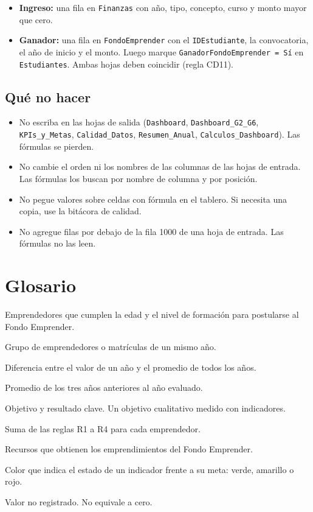 \documentclass[11pt,a4paper]{article}
\begin{document}
\begin{itemize}[leftmargin=1.4em]
  \item \textbf{Ingreso:} una fila en \texttt{Finanzas} con año, tipo, concepto, curso y monto mayor que cero.
  \item \textbf{Ganador:} una fila en \texttt{FondoEmprender} con el \texttt{IDEstudiante}, la convocatoria, el año de inicio y el monto. Luego marque \texttt{GanadorFondoEmprender = Sí} en \texttt{Estudiantes}. Ambas hojas deben coincidir (regla CD11).
\end{itemize}

\subsection{Qué no hacer}

\begin{itemize}[leftmargin=1.4em]
  \item No escriba en las hojas de salida (\texttt{Dashboard}, \texttt{Dashboard\_G2\_G6}, \texttt{KPIs\_y\_Metas}, \texttt{Calidad\_Datos}, \texttt{Resumen\_Anual}, \texttt{Calculos\_Dashboard}). Las fórmulas se pierden.
  \item No cambie el orden ni los nombres de las columnas de las hojas de entrada. Las fórmulas los buscan por nombre de columna y por posición.
  \item No pegue valores sobre celdas con fórmula en el tablero. Si necesita una copia, use la bitácora de calidad.
  \item No agregue filas por debajo de la fila 1000 de una hoja de entrada. Las fórmulas no las leen.
\end{itemize}

\section{Glosario}

\begin{description}[leftmargin=3.2cm,style=nextline]
  \item[Aptos] Emprendedores que cumplen la edad y el nivel de formación para postularse al Fondo Emprender.
  \item[Cohorte] Grupo de emprendedores o matrículas de un mismo año.
  \item[Desviación] Diferencia entre el valor de un año y el promedio de todos los años.
  \item[Línea base] Promedio de los tres años anteriores al año evaluado.
  \item[OKR] Objetivo y resultado clave. Un objetivo cualitativo medido con indicadores.
  \item[Puntaje de priorización] Suma de las reglas R1 a R4 para cada emprendedor.
  \item[Recursos apalancados] Recursos que obtienen los emprendimientos del Fondo Emprender.
  \item[Semáforo] Color que indica el estado de un indicador frente a su meta: verde, amarillo o rojo.
  \item[Sin dato] Valor no registrado. No equivale a cero.
\end{description}
\end{document}
